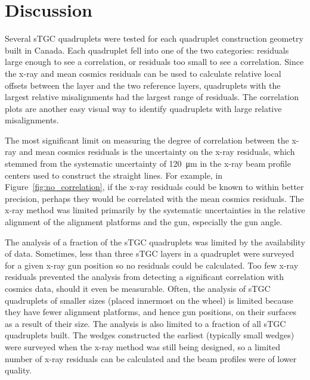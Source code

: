\section{Discussion}

Several sTGC quadruplets were tested for each quadruplet construction geometry built in Canada. Each quadruplet fell into one of the two categories: residuals large enough to see a correlation, or residuals too small to see a correlation. Since the x-ray and mean cosmics residuals can be used to calculate relative local offsets between the layer and the two reference layers, quadruplets with the largest relative misalignments had the largest range of residuals. The correlation plots are another easy visual way to identify quadruplets with large relative misalignments.

The most significant limit on measuring the degree of correlation between the x-ray and mean cosmics residuals is the uncertainty on the x-ray residuals, which stemmed from the systematic uncertainty of \SI{120}{\micro\meter} in the x-ray beam profile centers used to construct the straight lines. For example, in Figure~\ref{fig:no_correlation}, if the x-ray residuals could be known to within better precision, perhaps they would be correlated with the mean cosmics residuals. The x-ray method was limited primarily by the systematic uncertainties in the relative alignment of the alignment platforms and the gun, especially the gun angle.

The analysis of a fraction of the sTGC quadruplets was limited by the availability of data. Sometimes, less than three sTGC layers in a quadruplet were surveyed for a given x-ray gun position so no residuals could be calculated. Too few x-ray residuals prevented the analysis from detecting a significant correlation with cosmics data, should it even be measurable. Often, the analysis of sTGC quadruplets of smaller sizes (placed innermost on the wheel) is limited because they have fewer alignment platforms, and hence gun positions, on their surfaces as a result of their size. The analysis is also limited to a fraction of all sTGC quadruplets built. The wedges constructed the earliest (typically small wedges) were surveyed when the x-ray method was still being designed, so a limited number of x-ray residuals can be calculated and the beam profiles were of lower quality. 

